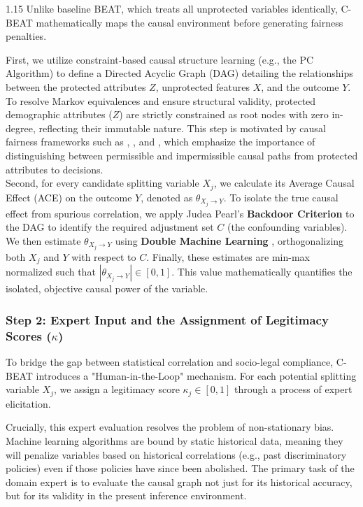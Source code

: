 \documentclass[11pt, a4paper]{article}
\begin{document}
\begin{spacing}{1.15}
Unlike baseline BEAT, which treats all unprotected variables identically, C-BEAT mathematically maps the causal environment before generating fairness penalties.

First, we utilize constraint-based causal structure learning (e.g., the PC Algorithm) to define a Directed Acyclic Graph (DAG) detailing the relationships between the protected attributes $Z$, unprotected features $X$, and the outcome $Y$. To resolve Markov equivalences and ensure structural validity, protected demographic attributes ($Z$) are strictly constrained as root nodes with zero in-degree, reflecting their immutable nature.
This step is motivated by causal fairness frameworks such as \cite{kilbertus2017avoiding}, \cite{kusner2017counterfactual}, and \cite{chiappa2019path}, which emphasize the importance of distinguishing between permissible and impermissible causal paths from protected attributes to decisions.\\

Second, for every candidate splitting variable $X_j$, we calculate its Average Causal Effect (ACE) on the outcome $Y$, denoted as $\theta_{X_j \rightarrow Y}$. To isolate the true causal effect from spurious correlation, we apply Judea Pearl’s \textbf{Backdoor Criterion} to the DAG to identify the required adjustment set $C$ (the confounding variables). We then estimate $\theta_{X_j \rightarrow Y}$ using \textbf{Double Machine Learning} \cite{chernozhukov2018double}, orthogonalizing both $X_j$ and $Y$ with respect to $C$. Finally, these estimates are min-max normalized such that $|\theta_{X_j \rightarrow Y}| \in [0,1]$. This value mathematically quantifies the isolated, objective causal power of the variable.

\subsubsection*{Step 2: Expert Input and the Assignment of Legitimacy Scores ($\kappa$)}

To bridge the gap between statistical correlation and socio-legal compliance, C-BEAT introduces a "Human-in-the-Loop" mechanism. For each potential splitting variable $X_j$, we assign a legitimacy score $\kappa_j \in [0,1]$ through a process of expert elicitation.

Crucially, this expert evaluation resolves the problem of non-stationary bias. Machine learning algorithms are bound by static historical data, meaning they will penalize variables based on historical correlations (e.g., past discriminatory policies) even if those policies have since been abolished. The primary task of the domain expert is to evaluate the causal graph not just for its historical accuracy, but for its validity in the present inference environment.


\end{spacing}
\end{document}
